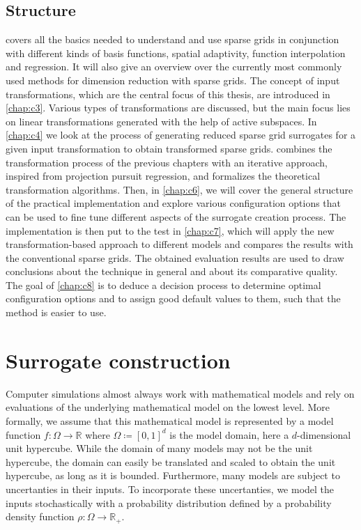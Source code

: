 \documentclass[
  a4paper,  %
  twoside,  %
  bibliography=totoc,
  headsepline,
  cleardoublepage=empty,
  parskip=half,
  draft=false
]{scrbook}
\begin{document}
\section{Structure}

 covers all the basics needed to understand and use sparse grids in conjunction with different kinds of basis functions, spatial adaptivity, function interpolation and regression.
It will also give an overview over the currently most commonly used methods for dimension reduction with sparse grids.
The concept of input transformations, which are the central focus of this thesis, are introduced in \cref{chap:c3}.
Various types of transformations are discussed, but the main focus lies on linear transformations generated with the help of active subspaces.
In \cref{chap:c4} we look at the process of generating reduced sparse grid surrogates for a given input transformation to obtain transformed sparse grids.
 combines the transformation process of the previous chapters with an iterative approach, inspired from projection pursuit regression, and formalizes the theoretical transformation algorithms.
Then, in \cref{chap:c6}, we will cover the general structure of the practical implementation and explore various configuration options that can be used to fine tune different aspects of the surrogate creation process.
The implementation is then put to the test in \cref{chap:c7}, which will apply the new transformation-based approach to different models and compares the results with the conventional sparse grids.
The obtained evaluation results are used to draw conclusions about the technique in general and about its comparative quality.
The goal of \cref{chap:c8} is to deduce a decision process to determine optimal configuration options and to assign good default values to them, such that the method is easier to use.


\chapter{Surrogate construction}
\label{chap:c2}

Computer simulations almost always work with mathematical models and rely on evaluations of the underlying mathematical model on the lowest level.
More formally, we assume that this mathematical model is represented by a model function $f \colon \Omega \to \mathds{R}$ where $\Omega \coloneqq [0,1]^d$ is the model domain, here a $d$-dimensional unit hypercube.
While the domain of many models may not be the unit hypercube, the domain can easily be translated and scaled to obtain the unit hypercube, as long as it is bounded.
Furthermore, many models are subject to uncertanties in their inputs.
To incorporate these uncertanties, we model the inputs stochastically with a probability distribution defined by a probability density function $\rho \colon \Omega \to \mathds{R_+}$.
\end{document}
